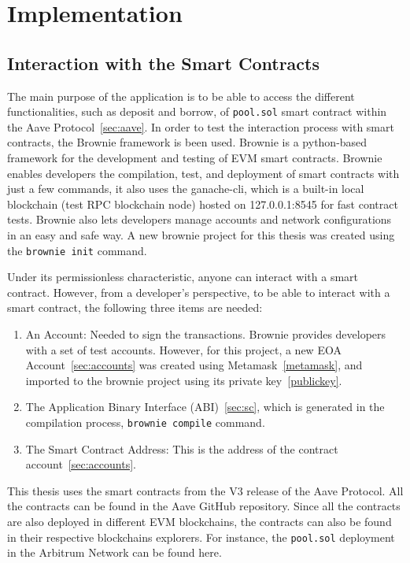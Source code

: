 \documentclass[11pt,a4paper]{report}
\begin{document}
\chapter{Implementation} \label{ch:impl}
\section{Interaction with the Smart Contracts}
The main purpose of the application is to be able to access the different functionalities, such as deposit and borrow, of \verb|pool.sol|  smart contract within the Aave Protocol~\ref{sec:aave}. In order to test the interaction process with smart contracts, the Brownie framework\cite{brow} is been used. Brownie is a python-based framework for the development and testing of EVM smart contracts. Brownie enables developers the compilation, test, and deployment of smart contracts with just a few commands, it also uses the ganache-cli\cite{ganache}, which is a built-in local blockchain (test RPC blockchain node) hosted on 127.0.0.1:8545 for fast contract tests. Brownie also lets developers manage accounts and network configurations in an easy and safe way. A new brownie project for this thesis was created using the \verb|brownie init| command.

Under its permissionless characteristic, anyone can interact with a smart contract. However, from a developer's perspective, to be able to interact with a smart contract, the following three items are needed:
\begin{enumerate}\label{sc_interaction}
	\item An Account: Needed to sign the transactions. Brownie provides developers with a set of test accounts. However, for this project, a new EOA Account~\ref{sec:accounts} was created using Metamask~\ref{metamask}, and imported to the brownie project using its private key~\ref{publickey}.
	\item The Application Binary Interface (ABI)~\ref{sec:sc}, which is generated in the compilation process, \verb|brownie compile| command.
	\item The Smart Contract Address: This is the address of the contract account~\ref{sec:accounts}. 
\end{enumerate}
This thesis uses the smart contracts from the V3 release of the Aave Protocol. All the contracts can be found in the Aave GitHub repository\cite{aavegithub}. Since all the contracts are also deployed in different EVM blockchains, the contracts can also be found in their respective blockchains explorers. For instance, the \verb|pool.sol| deployment in the Arbitrum Network can be found here\cite{arbiscan}.
\end{document}
